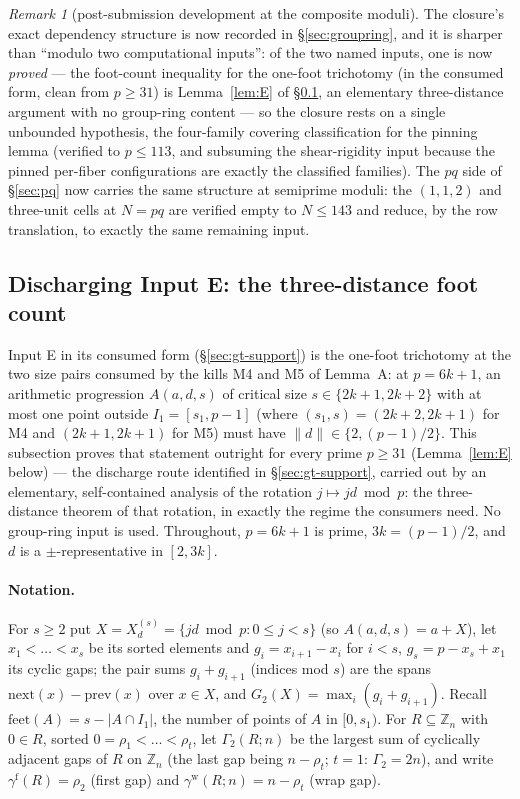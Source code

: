 \documentclass[11pt,a4paper]{article}
\numberwithin{equation}{section}
\theoremstyle{plain}
\theoremstyle{plain}
\theoremstyle{definition}
\theoremstyle{remark}
\newtheorem{remark}[theorem]{Remark}
\newcommand{\Z}{\mathbb{Z}}
\begin{document}
\begin{remark}[post-submission development at the composite moduli]
The closure's exact dependency structure is now recorded in
\S\ref{sec:groupring}, and it is sharper than ``modulo two computational
inputs'': of the two named inputs, one is now \emph{proved} --- the
foot-count inequality for the one-foot trichotomy (in the consumed form,
clean from $p\ge31$) is Lemma~\ref{lem:E} of \S\ref{sec:lemmaE}, an
elementary three-distance argument with no group-ring content --- so the
closure rests on a single unbounded hypothesis, the four-family covering
classification for the pinning lemma (verified to $p\le113$, and
subsuming the shear-rigidity input because the pinned per-fiber
configurations are exactly the classified families). The $pq$
side of \S\ref{sec:pq} now carries the same structure at semiprime moduli:
the $(1,1,2)$ and three-unit cells at $N=pq$ are verified empty to
$N\le143$ and reduce, by the row translation, to exactly the same
remaining input.
\end{remark}

\subsection{Discharging Input E: the three-distance foot count}\label{sec:lemmaE}

Input E in its consumed form (\S\ref{sec:gt-support}) is the one-foot
trichotomy at the two size pairs consumed by the kills M4 and M5 of
Lemma~A: at $p=6k+1$, an arithmetic progression $A(a,d,s)$ of critical
size $s\in\{2k{+}1,2k{+}2\}$ with at most one point outside
$I_1=[s_1,p-1]$ (where $(s_1,s)=(2k{+}2,2k{+}1)$ for M4 and
$(2k{+}1,2k{+}1)$ for M5) must have $\|d\|\in\{2,(p-1)/2\}$. This
subsection proves that statement outright for every prime $p\ge31$
(Lemma~\ref{lem:E} below) --- the discharge route identified in
\S\ref{sec:gt-support}, carried out by an elementary, self-contained
analysis of the rotation $j\mapsto jd\bmod p$: the three-distance
theorem of that rotation, in exactly the regime the consumers need. No
group-ring input is used. Throughout, $p=6k+1$ is prime, $3k=(p-1)/2$,
and $d$ is a $\pm$-representative in $[2,3k]$.

\paragraph{Notation.} For $s\ge2$ put
$X=X^{(s)}_d=\{jd\bmod p:0\le j<s\}$ (so $A(a,d,s)=a+X$), let
$x_1<\dots<x_s$ be its sorted elements and $g_i=x_{i+1}-x_i$ for $i<s$,
$g_s=p-x_s+x_1$ its cyclic gaps; the pair sums $g_i+g_{i+1}$ (indices
mod $s$) are the spans $\mathrm{next}(x)-\mathrm{prev}(x)$ over $x\in
X$, and $G_2(X)=\max_i(g_i+g_{i+1})$. Recall
$\mathrm{feet}(A)=s-|A\cap I_1|$, the number of points of $A$ in
$[0,s_1)$. For $R\subseteq\Z_n$ with $0\in R$, sorted
$0=\rho_1<\dots<\rho_t$, let $\Gamma_2(R;n)$ be the largest sum of
cyclically adjacent gaps of $R$ on $\Z_n$ (the last gap being
$n-\rho_t$; $t=1$: $\Gamma_2=2n$), and write
$\gamma^{\mathrm f}(R)=\rho_2$ (first gap) and
$\gamma^{\mathrm w}(R;n)=n-\rho_t$ (wrap gap).
\end{document}
